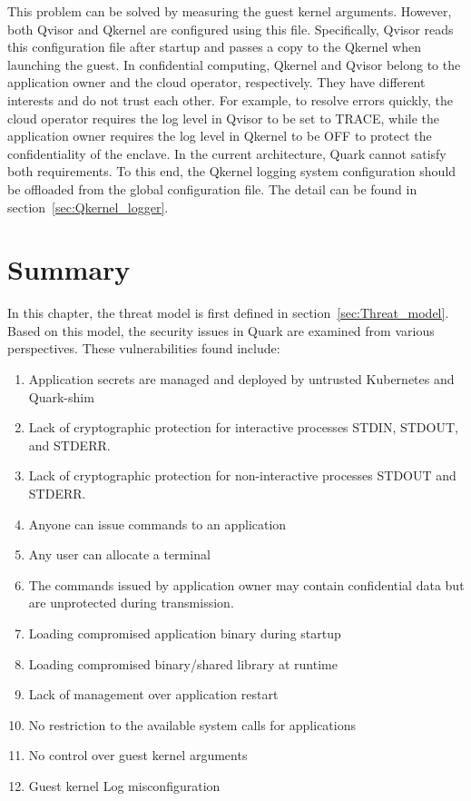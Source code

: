 This problem can be solved by measuring the guest kernel arguments. However, both Qvisor and Qkernel are configured using this file. Specifically, Qvisor reads this configuration file after startup and passes a copy to the Qkernel when launching the guest. In confidential 
computing, Qkernel and Qvisor belong to the application owner and the cloud operator, respectively. They have different interests and do not trust each other. For example, to resolve errors quickly, the cloud operator requires the log level in Qvisor to be set to TRACE, while the application owner 
requires the log level in Qkernel to be OFF to protect the confidentiality of the enclave. In the current architecture, Quark cannot satisfy both requirements. To this end, the Qkernel logging system configuration should be offloaded from the global configuration 
file. The detail can be found in section~\ref{sec:Qkernel_logger}.




\section{Summary}
In this chapter, the threat model is first defined in section~\ref{sec:Threat_model}. Based on this model, the security issues in Quark are examined from various perspectives. These vulnerabilities found include:
\begin{enumerate}
  \item Application secrets are managed and deployed by untrusted Kubernetes and Quark-shim
  \item Lack of cryptographic protection for interactive processes STDIN, STDOUT, and STDERR.
  \item Lack of cryptographic protection for non-interactive processes STDOUT and STDERR.
  \item Anyone can issue commands to an application
  \item Any user can allocate a terminal
  \item The commands issued by application owner may contain confidential data but are unprotected during transmission.
  \item Loading compromised application binary during startup
  \item Loading compromised binary/shared library at runtime
  \item Lack of management over application restart
  \item No restriction to the available system calls for applications
  \item No control over guest kernel arguments
  \item Guest kernel Log misconfiguration

\end{enumerate}

\cleardoublepage

